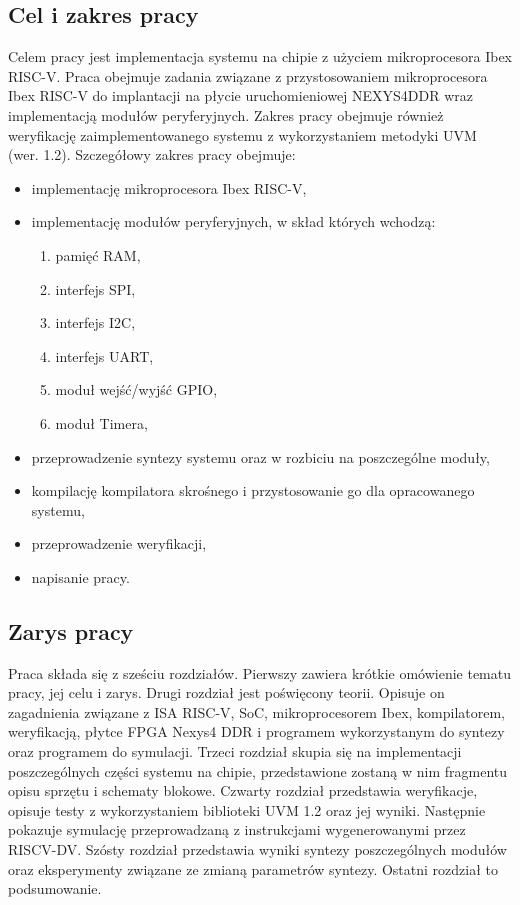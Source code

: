 \documentclass[11pt,a4paper]{article}
\begin{document}
\subsection{Cel i zakres pracy}
	\hspace{5mm}
	Celem pracy jest implementacja systemu na chipie z użyciem mikroprocesora Ibex RISC-V. Praca obejmuje zadania związane z przystosowaniem mikroprocesora Ibex RISC-V do implantacji na płycie uruchomieniowej NEXYS4DDR wraz implementacją modułów peryferyjnych. Zakres pracy obejmuje również weryfikację zaimplementowanego systemu z wykorzystaniem metodyki UVM (wer. 1.2).\newline
	Szczegółowy zakres pracy obejmuje:
	\begin{itemize}
	  \item implementację mikroprocesora Ibex RISC-V,
	  \item implementację modułów peryferyjnych, w skład których wchodzą:
	  \begin{enumerate}
	  	\item pamięć RAM,
	  	\item interfejs SPI,
	  	\item interfejs I2C,
	  	\item interfejs UART,
	  	\item moduł wejść/wyjść GPIO,
	  	\item moduł Timera,
	  \end{enumerate}
	  \item przeprowadzenie syntezy systemu oraz w rozbiciu na poszczególne moduły,
	  \item kompilację kompilatora skrośnego i przystosowanie go dla opracowanego systemu,
	  \item przeprowadzenie weryfikacji,
  	\item napisanie pracy.
	\end{itemize}

	\subsection{Zarys pracy}
	\hspace{5mm}
	Praca składa się z sześciu rozdziałów. Pierwszy zawiera krótkie omówienie tematu pracy, jej celu i zarys. Drugi rozdział jest poświęcony teorii. Opisuje on zagadnienia związane z ISA RISC-V, SoC, mikroprocesorem Ibex, kompilatorem, weryfikacją, płytce FPGA Nexys4 DDR i programem wykorzystanym do syntezy oraz programem do symulacji. Trzeci rozdział skupia się na implementacji poszczególnych części systemu na chipie, przedstawione zostaną w nim fragmentu opisu sprzętu i schematy blokowe. Czwarty rozdział przedstawia weryfikacje, opisuje testy z wykorzystaniem biblioteki UVM 1.2 oraz jej wyniki. Następnie pokazuje symulację przeprowadzaną z instrukcjami wygenerowanymi przez RISCV-DV. Szósty rozdział przedstawia wyniki syntezy poszczególnych modułów oraz eksperymenty związane ze zmianą parametrów syntezy.  Ostatni rozdział to podsumowanie.
\newpage
	
\end{document}
